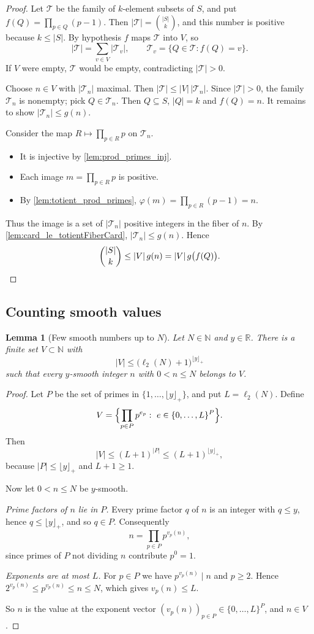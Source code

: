 \documentclass[11pt]{article}
\newtheorem{lemma}[theorem]{Lemma}
\theoremstyle{definition}
\theoremstyle{remark}
\newcommand{\floorp}[1]{\lfloor #1\rfloor_{+}}
\newcommand{\ltwo}{\ell_{2}}
\begin{document}
\begin{proof}
Let $\mathcal T$ be the family of $k$-element subsets of $S$, and put $f(Q)=\prod_{p\in Q}(p-1)$. Then $|\mathcal T|=\binom{|S|}{k}$, and this number is positive because $k\le|S|$. By hypothesis $f$ maps $\mathcal T$ into $V$, so
\[
|\mathcal T|=\sum_{v\in V}|\mathcal T_v|,\qquad \mathcal T_v=\{Q\in\mathcal T: f(Q)=v\}.
\]
If $V$ were empty, $\mathcal T$ would be empty, contradicting $|\mathcal T|>0$.

Choose $n\in V$ with $|\mathcal T_n|$ maximal. Then $|\mathcal T|\le |V|\,|\mathcal T_n|$. Since $|\mathcal T|>0$, the family $\mathcal T_n$ is nonempty; pick $Q\in\mathcal T_n$. Then $Q\subseteq S$, $|Q|=k$ and $f(Q)=n$. It remains to show $|\mathcal T_n|\le g(n)$.

Consider the map $R\mapsto \prod_{p\in R}p$ on $\mathcal T_n$.
\begin{itemize}
\item It is injective by \cref{lem:prod_primes_inj}.
\item Each image $m=\prod_{p\in R}p$ is positive.
\item By \cref{lem:totient_prod_primes}, $\varphi(m)=\prod_{p\in R}(p-1)=n$.
\end{itemize}
Thus the image is a set of $|\mathcal T_n|$ positive integers in the fiber of $n$. By \cref{lem:card_le_totientFiberCard}, $|\mathcal T_n|\le g(n)$. Hence
\[
\binom{|S|}{k}\le|V|\,g(n)=|V|\,g\bigl(f(Q)\bigr). \qedhere
\]
\end{proof}

\subsection{Counting smooth values}

\begin{lemma}[Few smooth numbers up to $N$]\label{lem:smooth_count}
Let $N\in\mathbb{N}$ and $y\in\mathbb{R}$. There is a finite set $V\subset\mathbb{N}$ with
\[
|V|\le\bigl(\ltwo(N)+1\bigr)^{\floorp{y}}
\]
such that every $y$-smooth integer $n$ with $0<n\le N$ belongs to $V$.
\end{lemma}

\begin{proof}
Let $P$ be the set of primes in $\{1,\dots,\floorp{y}\}$, and put $L=\ltwo(N)$. Define
\[
V=\Bigl\{\prod_{p\in P}p^{e_p}:\ e\in\{0,\dots,L\}^{P}\Bigr\}.
\]
Then
\[
|V|\le(L+1)^{|P|}\le(L+1)^{\floorp{y}},
\]
because $|P|\le\floorp{y}$ and $L+1\ge1$.

Now let $0<n\le N$ be $y$-smooth.

\emph{Prime factors of $n$ lie in $P$.} Every prime factor $q$ of $n$ is an integer with $q\le y$, hence $q\le\floorp{y}$, and so $q\in P$. Consequently
\[
n=\prod_{p\in P}p^{v_p(n)},
\]
since primes of $P$ not dividing $n$ contribute $p^0=1$.

\emph{Exponents are at most $L$.} For $p\in P$ we have $p^{v_p(n)}\mid n$ and $p\ge2$. Hence $2^{v_p(n)}\le p^{v_p(n)}\le n\le N$, which gives $v_p(n)\le L$.

So $n$ is the value at the exponent vector $(v_p(n))_{p\in P}\in\{0,\dots,L\}^P$, and $n\in V$.
\end{proof}
\end{document}
